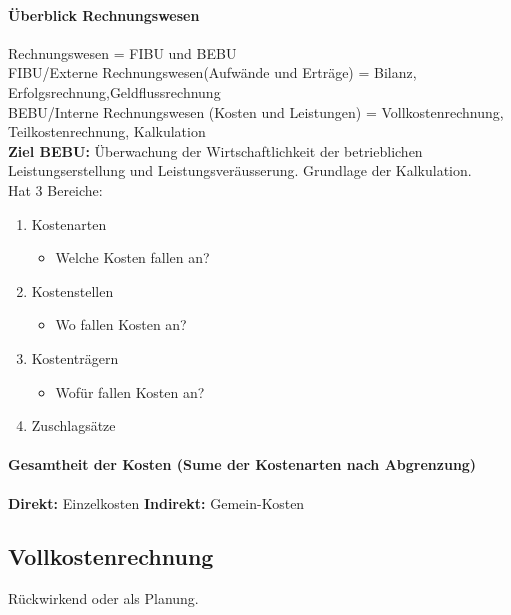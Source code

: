 \documentclass[../ZF_Wing.tex]{subfiles}
\begin{document}
\paragraph{Überblick Rechnungswesen}

Rechnungswesen = FIBU und BEBU\\
FIBU/Externe Rechnungswesen(Aufwände und Erträge) = Bilanz, Erfolgsrechnung,Geldflussrechnung\\
BEBU/Interne Rechnungswesen (Kosten und Leistungen) = Vollkostenrechnung, Teilkostenrechnung, Kalkulation\\

\textbf{Ziel BEBU:} Überwachung der Wirtschaftlichkeit der betrieblichen\\ Leistungserstellung und Leistungsveräusserung. Grundlage der Kalkulation. \\

Hat 3 Bereiche:
\begin{enumerate}
	\item Kostenarten
	\begin{itemize}
		\item Welche Kosten fallen an?
	\end{itemize}
	\item Kostenstellen
	\begin{itemize}
		\item Wo fallen Kosten an?
	\end{itemize}
	\item Kostenträgern
	\begin{itemize}
		\item Wofür fallen Kosten an?
	\end{itemize}
	\item Zuschlagsätze
\end{enumerate}


\paragraph{Gesamtheit der Kosten (Sume der Kostenarten nach Abgrenzung)\\}
\textbf{Direkt:} Einzelkosten
\textbf{Indirekt:} Gemein-Kosten


\subsection{Vollkostenrechnung}
Rückwirkend oder als Planung.\\
\end{document}
